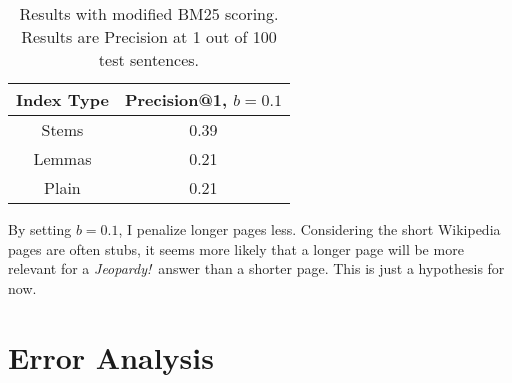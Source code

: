 \documentclass[11pt,letterpaper]{article}
\begin{document}
\begin{table}[h!]
	\begin{center}
		\begin{tabu} to \textwidth {cc}\toprule
			Index Type & Precision@1, $b=0.1$ \\ \midrule
			Stems & 0.39 \\
			Lemmas & 0.21 \\
			Plain & 0.21 \\\bottomrule
		\end{tabu}
		\caption{Results with modified BM25 scoring. Results are Precision at 1 out of 100 test sentences.}
		\label{table2}
	\end{center}
\end{table}


By setting $b = 0.1$, I penalize longer pages less.
Considering the short Wikipedia pages are often stubs, it seems more likely that a longer page will be more relevant for a \textit{Jeopardy!}~answer than a shorter page. This is just a hypothesis for now.


\section{Error Analysis}
\end{document}
